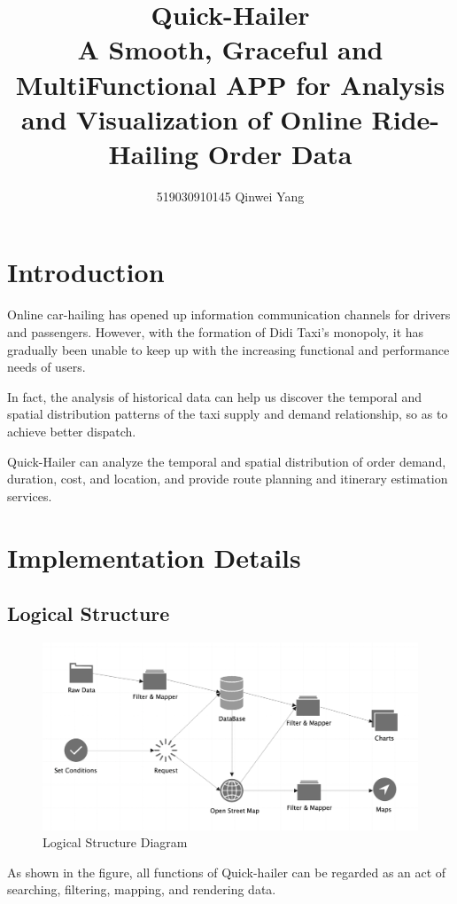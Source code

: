\documentclass{article}
\begin{document}
\author{519030910145 Qinwei Yang}
\title{\Huge{Quick-Hailer}\\\normalsize{A Smooth, Graceful and MultiFunctional APP for Analysis and Visualization of Online Ride-Hailing Order Data}}
\maketitle
\setcounter{tocdepth}{2}
\setlength{\parindent}{2em}

\section{Introduction}
Online car-hailing has opened up information communication channels for drivers and passengers. However, with the formation of Didi Taxi's monopoly, it has gradually been unable to keep up with the increasing functional and performance needs of users. 

In fact, the analysis of historical data can help us discover the temporal and spatial distribution patterns of the taxi supply and demand relationship, so as to achieve better dispatch.

Quick-Hailer can analyze the temporal and spatial distribution of order demand, duration, cost, and location, and provide route planning and itinerary estimation services.
\section{Implementation Details}
\subsection{Logical Structure}
\setlength{\parindent}{0em}
\begin{figure}[htbp] 
	\centering 
	\includegraphics[scale=0.3]{LogicalStructure.png}
	\caption{Logical Structure Diagram}
\end{figure}
\setlength{\parindent}{2em}
As shown in the figure, all functions of Quick-hailer can be regarded as an act of searching, filtering, mapping, and rendering data.
\end{document}
